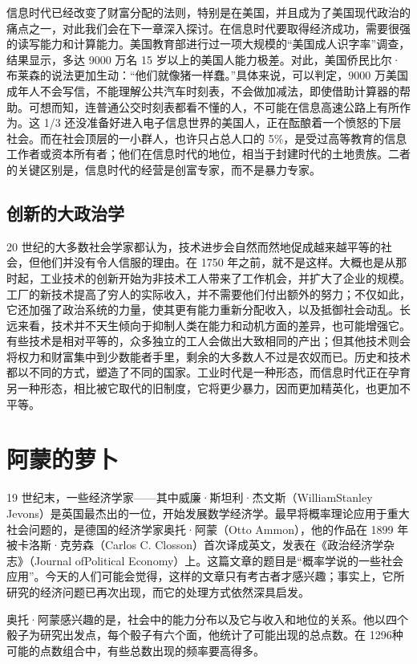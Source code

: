 信息时代已经改变了财富分配的法则，特别是在美国，并且成为了美国现代政治的痛点之一，对此我们会在下一章深入探讨。在信息时代要取得经济成功，需要很强的读写能力和计算能力。美国教育部进行过一项大规模的“美国成人识字率”调查，结果显示，多达 9000 万名 15 岁以上的美国人能力极差。对此，美国侨民比尔·布莱森的说法更加生动：“他们就像猪一样蠢。”具体来说，可以判定，9000 万美国成年人不会写信，不能理解公共汽车时刻表，不会做加减法，即使借助计算器的帮助。可想而知，连普通公交时刻表都看不懂的人，不可能在信息高速公路上有所作为。这 1/3 还没准备好进入电子信息世界的美国人，正在酝酿着一个愤怒的下层社会。而在社会顶层的一小群人，也许只占总人口的 5\%，是受过高等教育的信息工作者或资本所有者；他们在信息时代的地位，相当于封建时代的土地贵族。二者的关键区别是，信息时代的经营是创富专家，而不是暴力专家。

\subsection{创新的大政治学}
20 世纪的大多数社会学家都认为，技术进步会自然而然地促成越来越平等的社会，但他们并没有令人信服的理由。在 1750 年之前，就不是这样。大概也是从那时起，工业技术的创新开始为非技术工人带来了工作机会，并扩大了企业的规模。工厂的新技术提高了穷人的实际收入，并不需要他们付出额外的努力；不仅如此，它还加强了政治系统的力量，使其更有能力重新分配收入，以及抵御社会动乱。长远来看，技术并不天生倾向于抑制人类在能力和动机方面的差异，也可能增强它。有些技术是相对平等的，众多独立的工人会做出大致相同的产出；但其他技术则会将权力和财富集中到少数能者手里，剩余的大多数人不过是农奴而已。历史和技术都以不同的方式，塑造了不同的国家。工业时代是一种形态，而信息时代正在孕育另一种形态，相比被它取代的旧制度，它将更少暴力，因而更加精英化，也更加不平等。

\section{阿蒙的萝卜}
19 世纪末，一些经济学家——其中威廉·斯坦利·杰文斯（WilliamStanley Jevons）是英国最杰出的一位，开始发展数学经济学。最早将概率理论应用于重大社会问题的，是德国的经济学家奥托·阿蒙（Otto Ammon），他的作品在 1899 年被卡洛斯·克劳森（Carlos C. Closson）首次译成英文，发表在《政治经济学杂志》（Journal ofPolitical Economy）上。这篇文章的题目是“概率学说的一些社会应用”。今天的人们可能会觉得，这样的文章只有考古者才感兴趣；事实上，它所研究的经济问题已再次出现，而它的处理方式依然深具启发。

奥托·阿蒙感兴趣的是，社会中的能力分布以及它与收入和地位的关系。他以四个骰子为研究出发点，每个骰子有六个面，他统计了可能出现的总点数。在 1296种可能的点数组合中，有些总数出现的频率要高得多。

